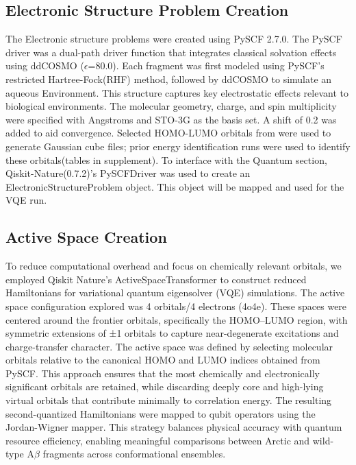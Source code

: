 \documentclass[pdflatex,sn-mathphys-num]{sn-jnl}%
\theoremstyle{thmstyleone}%
\theoremstyle{thmstyletwo}%
\theoremstyle{thmstylethree}%
\begin{document}
\subsection{\textbf{Electronic Structure Problem Creation}}
The Electronic structure problems were created using PySCF\cite{pyscf2020} 2.7.0. The PySCF\cite{pyscf2020} driver was a dual-path driver function that integrates classical solvation effects using ddCOSMO ($\epsilon$=80.0). Each fragment was first modeled using PySCF\cite{pyscf2020}’s restricted Hartree-Fock(RHF) method, followed by ddCOSMO to simulate an aqueous Environment. This structure captures key electrostatic effects relevant to biological environments. The molecular geometry, charge, and spin multiplicity were specified with Angstroms and STO-3G as the basis set. A shift of 0.2 was added to aid convergence. Selected HOMO-LUMO orbitals from were used to generate Gaussian cube files; prior energy identification runs were used to identify these orbitals(tables in supplement). To interface with the Quantum section, Qiskit-Nature\cite{qiskit2019}\cite{qiskit_nature2021}(0.7.2)’s PySCFDriver\cite{pyscf2020} was used to create an ElectronicStructureProblem object. This object will be mapped and used for the VQE\cite{peruzzo2014} run.

\subsection{\textbf{Active Space\cite{active_space} Creation}}
To reduce computational overhead and focus on chemically relevant orbitals, we employed Qiskit\cite{qiskit2019} Nature’s ActiveSpaceTransformer to construct reduced Hamiltonians for variational quantum eigensolver (VQE\cite{peruzzo2014}) simulations.  The active space\cite{active_space} configuration explored was 4 orbitals/4 electrons (4o4e). These spaces were centered around the frontier orbitals, specifically the HOMO–LUMO region, with symmetric extensions of ±1 orbitals to capture near-degenerate excitations and charge-transfer character.
The active space\cite{active_space} was defined by selecting molecular orbitals relative to the canonical HOMO and LUMO indices obtained from PySCF\cite{pyscf2020}. This approach ensures that the most chemically and electronically significant orbitals are retained, while discarding deeply core and high-lying virtual orbitals that contribute minimally to correlation energy. The resulting second-quantized Hamiltonians were mapped to qubit operators using the Jordan-Wigner mapper. This strategy balances physical accuracy with quantum resource efficiency, enabling meaningful comparisons between Arctic and wild-type A$\beta$ fragments across conformational ensembles.
\end{document}
